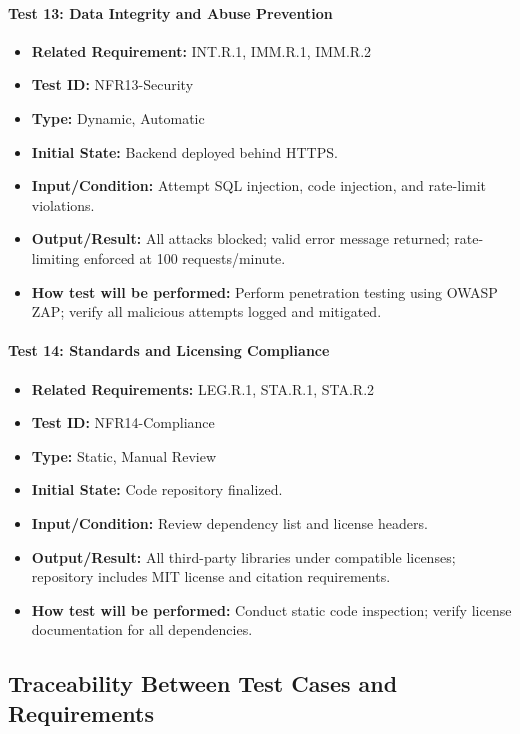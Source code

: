 \documentclass[12pt, titlepage]{article}
\begin{document}
\paragraph{Test 13: Data Integrity and Abuse Prevention}
\begin{itemize}
    \item \textbf{Related Requirement:} INT.R.1, IMM.R.1, IMM.R.2
    \item \textbf{Test ID:} NFR13-Security
    \item \textbf{Type:} Dynamic, Automatic
    \item \textbf{Initial State:} Backend deployed behind HTTPS.
    \item \textbf{Input/Condition:} Attempt SQL injection, code injection, and rate-limit violations.
    \item \textbf{Output/Result:} All attacks blocked; valid error message returned; rate-limiting enforced at 100 requests/minute.
    \item \textbf{How test will be performed:} Perform penetration testing using OWASP ZAP; verify all malicious attempts logged and mitigated.
\end{itemize}

\paragraph{Test 14: Standards and Licensing Compliance}
\begin{itemize}
    \item \textbf{Related Requirements:} LEG.R.1, STA.R.1, STA.R.2
    \item \textbf{Test ID:} NFR14-Compliance
    \item \textbf{Type:} Static, Manual Review
    \item \textbf{Initial State:} Code repository finalized.
    \item \textbf{Input/Condition:} Review dependency list and license headers.
    \item \textbf{Output/Result:} All third-party libraries under compatible licenses; repository includes MIT license and citation requirements.
    \item \textbf{How test will be performed:} Conduct static code inspection; verify license documentation for all dependencies.
\end{itemize}


\subsection{Traceability Between Test Cases and Requirements}
\end{document}
